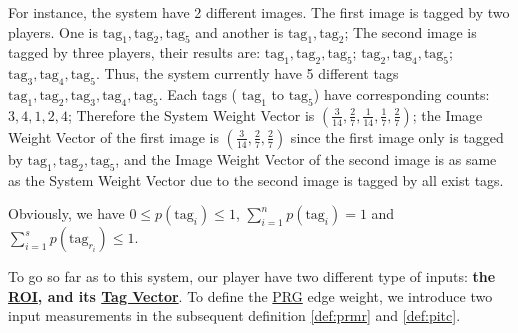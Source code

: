 For instance, the system have 2 different images. The first image is tagged by two players. One is 
$\text{tag}_1, \text{tag}_2, \text{tag}_5$ and another is $\text{tag}_1, \text{tag}_2$;
The second image is tagged by three players, their results are:
$\text{tag}_1, \text{tag}_2, \text{tag}_5$;
$\text{tag}_2, \text{tag}_4, \text{tag}_5$; 
$\text{tag}_3, \text{tag}_4, \text{tag}_5$. 
Thus, the system currently have 5 different tags $\text{tag}_1, \text{tag}_2, \text{tag}_3, \text{tag}_4, \text{tag}_5$.
Each tags ( $\text{tag}_1$ to $\text{tag}_5$) have corresponding counts: $3, 4, 1, 2, 4$; Therefore the
System Weight Vector is $(\frac{3}{14}, \frac{2}{7}, \frac{1}{14}, \frac{1}{7}, \frac{2}{7})$;
the Image Weight Vector of the first image is $(\frac{3}{14}, \frac{2}{7}, \frac{2}{7})$
since the first image only is tagged by $\text{tag}_1, \text{tag}_2, \text{tag}_5$, and
the Image Weight Vector of the second image is as same as the System Weight Vector
due to the second image is tagged by all exist tags.

Obviously, we have $0 \leq p(\text{tag}_i)\leq 1$, $\sum_{i=1}^{n}{p(\text{tag}_{i})}=1$ and $\sum_{i=1}^{s}{p(\text{tag}_{r_i})} \leq 1$.

To go so far as to this system, our player have two different type of inputs: \textbf{the \hyperref[def:roi]{ROI}, 
and its \hyperref[def:tagv]{Tag Vector}}. To define the \hyperref[idx:prg]{PRG} edge weight, 
we introduce two input measurements in the subsequent definition \ref{def:prmr} and \ref{def:pitc}.


